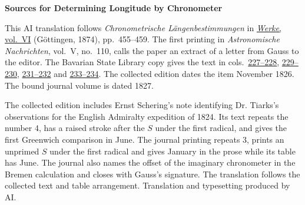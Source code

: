 \clearpage\thispagestyle{empty}
\begin{center}\textbf{Sources for Determining Longitude by Chronometer}\end{center}
\noindent This AI translation follows \textit{Chronometrische Längenbestimmungen} in \href{https://gdz.sub.uni-goettingen.de/id/PPN236007467}{\textit{Werke}, vol.~VI} (Göttingen, 1874), pp.~455--459. The first printing in \textit{Astronomische Nachrichten}, vol.~V, no.~110, calls the paper an extract of a letter from Gauss to the editor. The Bavarian State Library copy gives the text in cols.~\href{https://api.digitale-sammlungen.de/iiif/image/v2/bsb10049430_00124/full/1500,/0/default.jpg}{227--228}, \href{https://api.digitale-sammlungen.de/iiif/image/v2/bsb10049430_00125/full/1500,/0/default.jpg}{229--230}, \href{https://api.digitale-sammlungen.de/iiif/image/v2/bsb10049430_00126/full/1500,/0/default.jpg}{231--232} and \href{https://api.digitale-sammlungen.de/iiif/image/v2/bsb10049430_00127/full/1500,/0/default.jpg}{233--234}. The collected edition dates the item November 1826. The bound journal volume is dated 1827.
\par\smallskip\noindent The collected edition includes Ernst Schering’s note identifying Dr. Tiarks’s observations for the English Admiralty expedition of 1824. Its text repeats the number 4, has a raised stroke after the $S$ under the first radical, and gives the first Greenwich comparison in June. The journal printing repeats 3, prints an unprimed $S$ under the first radical and gives January in the prose while its table has June. The journal also names the offset of the imaginary chronometer in the Bremen calculation and closes with Gauss’s signature. The translation follows the collected text and table arrangement. Translation and typesetting produced by AI.
\clearpage
